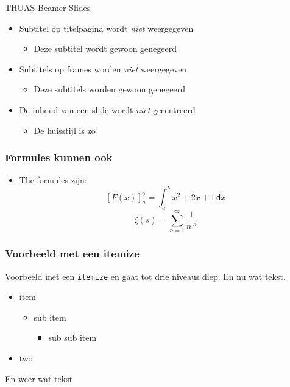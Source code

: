 \documentclass[fleqn,aspectratio=43]{beamer}
\begin{document}
\begin{frame}{THUAS Beamer Slides}
\begin{itemize}
\item Subtitel op titelpagina wordt \emph{niet} weergegeven
\begin{itemize}
\item Deze subtitel wordt gewoon genegeerd
\end{itemize}
\item Subtitels op frames worden \emph{niet} weergegeven
\begin{itemize}
\item Deze subtitels worden gewoon genegeerd
\end{itemize}
\item De inhoud van een slide wordt \emph{niet} gecentreerd
\begin{itemize}
\item De huisstijl is zo
\end{itemize}
\end{itemize}
\end{frame}

\begin{frame}
\frametitle{Formules kunnen ook}
\begin{itemize}
\item The formules zijn:
\begin{equation*}
\left[F(x)\right]^b_a = \int_a^b x^2 + 2x + 1 \, \mathsf{d} x
\end{equation*}
\begin{equation*}
\zeta (s) = \sum_{n=1}^\infty \dfrac{1}{n^{\;\!s}}
\end{equation*}
\end{itemize}
\end{frame}

\begin{frame}
\frametitle{Voorbeeld met een itemize}
Voorbeeld met een \texttt{itemize} en gaat tot drie niveaus diep.
En nu wat tekst.
\begin{itemize}
\item item
\begin{itemize}
\item sub item
\begin{itemize}
\item sub sub item
\end{itemize}
\end{itemize}
\item two
\end{itemize}
En weer wat tekst
\end{frame}
\end{document}
